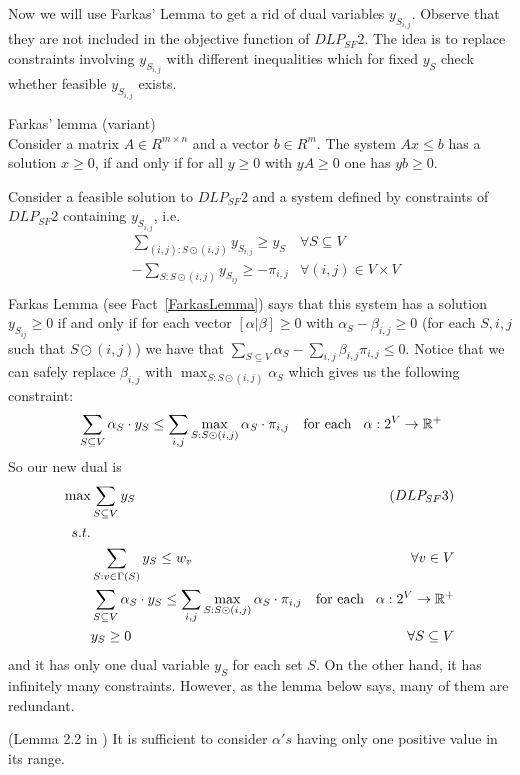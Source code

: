 Now we will use Farkas' Lemma to get a rid of dual variables $y_{S_{i,j}}$. Observe that they are not included in the objective function of $DLP_{SF} 2$. The idea is to replace constraints involving $y_{S_{i,j}}$ with different inequalities which for fixed $y_S$ check whether feasible $y_{S_{i,j}}$ exists.

\begin{fact} Farkas' lemma (variant)\\
	\label{FarkasLemma}
	Consider a matrix $A \in R^{m \times n}$ and a vector $b \in R^m$. The system $Ax\leq b$ has a solution $x \geq 0$, if and only if for all $y\geq 0$ with $yA \geq 0$ one has $yb \geq 0$.
\end{fact}

Consider a feasible solution to $DLP_{SF} 2$ and a system defined by constraints of $DLP_{SF} 2$ containing $y_{S_{i,j}}$, i.e.
\begin{align*}
& \sum_{(i,j): S\odot(i,j)} y_{S_{i,j}} \geq y_S			& \forall S \subseteq V\\
& -\sum_{S:S\odot(i,j)} y_{S_{ij}} \geq -\pi_{i,j}			& \forall (i,j) \in V \times V\\
\end{align*}
Farkas Lemma (see Fact~\ref{FarkasLemma}) says that this system has a solution $y_{S_{ij}} \geq 0$ if and only if for each vector $[\alpha | \beta] \geq 0$ with $\alpha_S - \beta_{i,j} \geq 0$ (for each $S, i,j$ such that $S\odot(i,j)$) we have that $\sum_{S\subseteq V} \alpha_S - \sum_{i,j} \beta_{i,j} \pi_{i,j} \leq 0$.
Notice that we can safely replace $\beta_{i,j}$ with $\max_{S: S\odot(i,j)}{\alpha_S}$ which gives us the following constraint:
\begin{align*}
& \sum_{S\subseteq V} \alpha_S \cdot y_S \leq \sum_{i,j} \max_{S: S\odot(i,j)}{\alpha_S} \cdot \pi_{i,j} & \text{for each} \hspace{3mm}\alpha: 2^V \rightarrow \mathbb{R}^+\\
\end{align*}
So our new dual is
\begin{align*}
\text{max} & \sum_{S \subseteq V} y_S & (DLP_{SF} 3)\\
s.t.\\
& \sum_{S:v\in\Gamma(S)} y_S \leq w_v						& \forall v \in V\\
& \sum_{S\subseteq V} \alpha_S \cdot y_S \leq \sum_{i,j} \max_{S: S\odot(i,j)}{\alpha_S} \cdot \pi_{i,j} & \text{for each} \hspace{3mm}\alpha: 2^V \rightarrow \mathbb{R}^+\\
& y_S \geq 0												& \forall S \subseteq V\\
\end{align*}
and it has only one dual variable $y_S$ for each set $S$. On the other hand, it has infinitely many constraints. However, as the lemma below says, many of them are redundant.
\begin{lemma} (Lemma 2.2 in \cite{Hajiaghayi})
It is sufficient to consider $\alpha's$ having only one positive value in its range.
\end{lemma}

